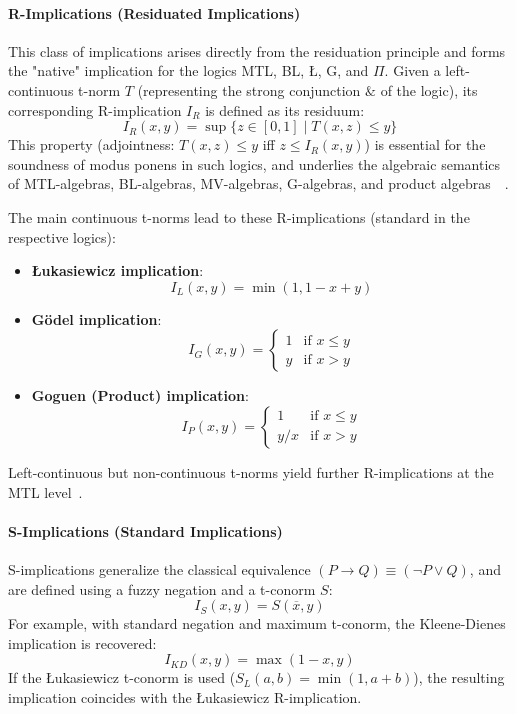 \paragraph{R-Implications (Residuated Implications)}
This class of implications arises directly from the residuation principle and forms the "native" implication for the logics MTL, BL, Ł, G, and $\Pi$. Given a left-continuous t-norm $T$ (representing the strong conjunction $\&$ of the logic), its corresponding R-implication $I_R$ is defined as its residuum:
\[
I_R(x, y) = \sup\{z \in [0,1] \mid T(x, z) \le y\}
\]
This property (adjointness: $T(x,z) \le y$ iff $z \le I_R(x, y)$) is essential for the soundness of modus ponens in such logics, and underlies the algebraic semantics of MTL-algebras, BL-algebras, MV-algebras, G-algebras, and product algebras~\cite[Sec. 2.3, Ch. 3, Ch. 4]{Hajek1998}~\cite{GodoMonoidal}.

\begin{example}
The main continuous t-norms lead to these R-implications (standard in the respective logics):
\begin{itemize}
    \item \textbf{Łukasiewicz implication}:
        \[
        I_L(x, y) = \min(1, 1-x+y)
        \]
    \item \textbf{Gödel implication}:
        \[
        I_G(x, y) = 
        \begin{cases}
            1 & \text{if } x \le y \\
            y & \text{if } x > y
        \end{cases}
        \]
    \item \textbf{Goguen (Product) implication}:
        \[
        I_P(x, y) = 
        \begin{cases}
            1 & \text{if } x \le y \\
            y/x & \text{if } x > y
        \end{cases}
        \]
\end{itemize}
Left-continuous but non-continuous t-norms yield further R-implications at the MTL level~\cite{GodoMonoidal}.
\end{example}

\paragraph{S-Implications (Standard Implications)}
S-implications generalize the classical equivalence $(P \rightarrow Q) \equiv (\lnot P \vee Q)$, and are defined using a fuzzy negation and a t-conorm $S$:
\[
I_S(x, y) = S(\overline{x}, y)
\]
For example, with standard negation and maximum t-conorm, the Kleene-Dienes implication is recovered:
\[
I_{KD}(x, y) = \max(1-x, y)
\]
If the Łukasiewicz t-conorm is used ($S_L(a, b) = \min(1, a+b)$), the resulting implication coincides with the Łukasiewicz R-implication.


